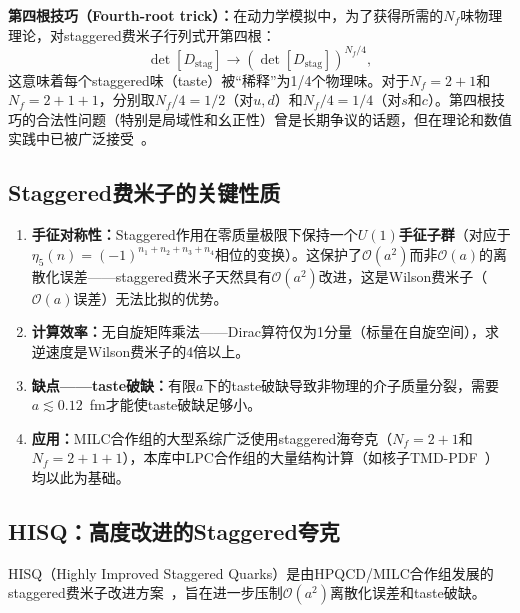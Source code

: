 \documentclass[12pt,a4paper]{ctexart}
\theoremstyle{definition}
\begin{document}
\textbf{第四根技巧（Fourth-root trick）：}在动力学模拟中，为了获得所需的$N_f$味物理理论，对staggered费米子行列式开第四根：
\begin{equation}
\det[D_{\text{stag}}] \to (\det[D_{\text{stag}}])^{N_f/4},
\label{eq:fourth_root}
\end{equation}
这意味着每个staggered味（taste）被``稀释''为1/4个物理味。对于$N_f=2+1$和$N_f=2+1+1$，分别取$N_f/4 = 1/2$（对$u,d$）和$N_f/4 = 1/4$（对$s$和$c$）。第四根技巧的合法性问题（特别是局域性和幺正性）曾是长期争议的话题，但在理论和数值实践中已被广泛接受~\cite{Durr2004,Sharpe2006}。

\subsection{Staggered费米子的关键性质}

\begin{enumerate}[leftmargin=*]
    \item \textbf{手征对称性：}Staggered作用在零质量极限下保持一个\textbf{$U(1)$手征子群}（对应于$\eta_5(n) = (-1)^{n_1+n_2+n_3+n_4}$相位的变换）。这保护了$\mathcal{O}(a^2)$而非$\mathcal{O}(a)$的离散化误差——staggered费米子天然具有$\mathcal{O}(a^2)$改进，这是Wilson费米子（$\mathcal{O}(a)$误差）无法比拟的优势。
    \item \textbf{计算效率：}无自旋矩阵乘法——Dirac算符仅为1分量（标量在自旋空间），求逆速度是Wilson费米子的4倍以上。
    \item \textbf{缺点——taste破缺：}有限$a$下的taste破缺导致非物理的介子质量分裂，需要$a \lesssim 0.12$~fm才能使taste破缺足够小。
    \item \textbf{应用：}MILC合作组的大型系综广泛使用staggered海夸克（$N_f=2+1$和$N_f=2+1+1$），本库中LPC合作组的大量结构计算（如核子TMD-PDF~\cite{He2024unpolTMD}）均以此为基础。
\end{enumerate}

\subsection{HISQ：高度改进的Staggered夸克}

HISQ（Highly Improved Staggered Quarks）是由HPQCD/MILC合作组发展的staggered费米子改进方案~\cite{Follana2007HISQ}，旨在进一步压制$\mathcal{O}(a^2)$离散化误差和taste破缺。
\end{document}
